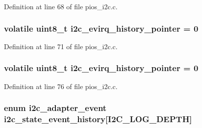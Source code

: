 \-Definition at line 68 of file pios\-\_\-i2c.\-c.

\hypertarget{group___p_i_o_s___i2_c_gadf5676851d3bae320be666713dd5cb95}{
\subsubsection[{i2c\-\_\-evirq\-\_\-history\-\_\-pointer}]{\setlength{\rightskip}{0pt plus 5cm}volatile uint8\-\_\-t {\bf i2c\-\_\-evirq\-\_\-history\-\_\-pointer} = 0}}\label{group___p_i_o_s___i2_c_gadf5676851d3bae320be666713dd5cb95}


\-Definition at line 71 of file pios\-\_\-i2c.\-c.

\hypertarget{group___p_i_o_s___i2_c_gadf5676851d3bae320be666713dd5cb95}{
\subsubsection[{i2c\-\_\-evirq\-\_\-history\-\_\-pointer}]{\setlength{\rightskip}{0pt plus 5cm}volatile uint8\-\_\-t {\bf i2c\-\_\-evirq\-\_\-history\-\_\-pointer} = 0}}\label{group___p_i_o_s___i2_c_gadf5676851d3bae320be666713dd5cb95}


\-Definition at line 76 of file pios\-\_\-i2c.\-c.

\hypertarget{group___p_i_o_s___i2_c_gad2fddef6926d27512901cbe84b7b99bd}{
\subsubsection[{i2c\-\_\-state\-\_\-event\-\_\-history}]{\setlength{\rightskip}{0pt plus 5cm}enum {\bf i2c\-\_\-adapter\-\_\-event} {\bf i2c\-\_\-state\-\_\-event\-\_\-history}\mbox{[}\-I2\-C\-\_\-\-L\-O\-G\-\_\-\-D\-E\-P\-T\-H\mbox{]}}}\label{group___p_i_o_s___i2_c_gad2fddef6926d27512901cbe84b7b99bd}


